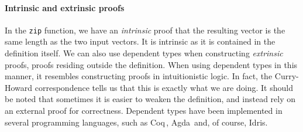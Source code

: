 \paragraph{Intrinsic and extrinsic proofs} In the \texttt{zip} function, we have an \emph{intrinsic} proof that the resulting vector is the same length as the two input vectors. It is intrinsic as it is contained in the definition itself. We can also use dependent types when constructing \emph{extrinsic} proofs, proofs residing outside the definition. When using dependent types in this manner, it resembles constructing proofs in intuitionistic logic. In fact, the Curry-Howard correspondence tells us that this is exactly what we are doing. It should be noted that sometimes it is easier to weaken the definition, and instead rely on an external proof for correctness. Dependent types have been implemented in several programming languages, such as Coq\,\cite{Coq}, Agda\,\cite{Agda} and, of course, Idris. 

